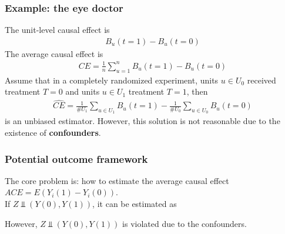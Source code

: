 \documentclass{beamer}
\begin{document}
\begin{frame}
    \frametitle{Example: the eye doctor}
    The unit-level causal effect is
    \begin{align*}
        B_u(t=1) - B_u(t=0)
    \end{align*}
    The average causal effect is
    \begin{align*}
        CE = \frac{1}{n}\sum_{u=1}^n B_u(t=1) - B_u(t=0)
    \end{align*}
    Assume that in a completely randomized experiment, units $u\in U_0$ received treatment $T=0$ and 
    units $u\in U_1$ treatment $T = 1$, then
    \begin{align*}
        \widehat{CE}=\frac{1}{\# U_1}\sum_{u\in U_1}B_u(t=1) - \frac{1}{\# U_0}\sum_{u\in U_0}B_u(t=0)
    \end{align*}
    is an unbiased estimator. However, this solution is not reasonable due to the existence of
    \textbf{confounders}.
\end{frame}

\begin{frame}
    \frametitle{Potential outcome framework}
    \begin{flushleft}
        The core problem is: how to estimate the average causal effect $ACE=E(Y_i(1) - Y_i(0))$. \\
        If $Z\Vbar (Y(0),Y(1))$, it can be estimated as
    \end{flushleft}
    \begin{flushleft}
        However, $Z\Vbar (Y(0),Y(1))$ is violated due to the confounders. 
    \end{flushleft}
\end{frame}
\end{document}
